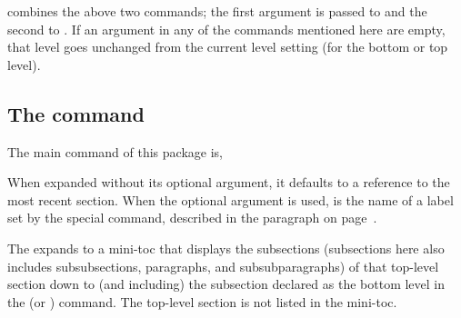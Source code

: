 \documentclass[10pt]{article}
\begin{document}
 combines the
above two commands; the first argument is passed to  and the
second to . If an argument in any of the commands mentioned here
are empty, that level goes unchanged from the current level setting (for the
bottom or top level).



\subsection{The \texorpdfstring{\protect{}}{\textbackslash{insertminitoc}} command}

The main command of this package is,
%
\bVerb{}%
\setlength{\dimen0}{\wd\webtempboxi+2\fboxsep+2\fboxrule}%
\def\1{\rlap{\mbox{\sffamily\hskip\dimen0 (OK to use \texttt{@} in environment)}}}
\begin{dCmd}[commandchars=!()]{\bxSize}
\end{dCmd}
\eVerb When expanded without its optional argument, it defaults to a reference
to the most recent section. When the optional argument is used, 
is the name of a label set by the special  command, described in
the paragraph \textbf{} on page~\pageref*{para:mtocRef}.

The \cs{insertminitoc[\ameta{label-name}} expands to a mini-toc that displays the subsections
(subsections here also includes subsubsections, paragraphs, and
subsubparagraphs) of that top-level section down to (and including) the
subsection declared as the bottom level in the  (or
) command. The top-level section is not listed in the mini-toc.
\end{document}
